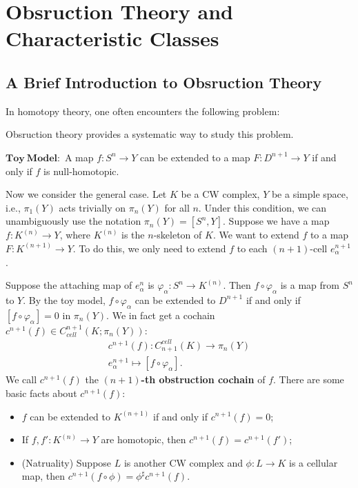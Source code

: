 \documentclass[12pt,a4paper]{article}
\theoremstyle{definition}
\begin{document}
\section*{Obsruction Theory and Characteristic Classes}
\subsection*{A Brief Introduction to Obsruction Theory}
In homotopy theory, one often encounters the following problem: 
\begin{center}
\end{center}
Obsruction theory provides a systematic way to study 
this problem. 

$\mathbf{Toy\ Model:}$ A map $f:S^n\to Y$ can be extended to a map 
$F:D^{n+1}\to Y$ if and only if $f$ is null-homotopic.

Now we consider the general case. Let $K$ be a CW complex, $Y$ be a simple 
space, i.e., $\pi_1(Y)$ acts trivially on $\pi_n(Y)$ for all $n$. Under this 
condition, we can unambiguously use the notation $\pi_n(Y) = [S^n, Y]$.  
Suppose we have a map $f:K^{(n)}\to Y$, where $K^{(n)}$ is the 
$n$-skeleton of $K$. We want to extend $f$ to a map $F:K^{(n+1)}\to Y$. 
To do this, we only need to extend $f$ to each $(n+1)$-cell $e_\alpha^{n+1}$. 

Suppose the attaching map of $e_\alpha^n$ is 
$\varphi_\alpha:S^{n}\to K^{(n)}.$ Then $f\circ \varphi_\alpha$ is a map
from $S^{n}$ to $Y$. By the toy model, $f\circ \varphi_\alpha$ can be
extended to $D^{n+1}$ if and only if $[f\circ \varphi_\alpha] = 0$ in
$\pi_{n}(Y)$. We in fact get a cochain 
$c^{n+1}(f)\in C^{n+1}_{cell}(K;\pi_{n}(Y))$: 
\begin{align*}
    c^{n+1}(f):C_{n+1}^{cell}(K)\to \pi_{n}(Y) \\
    e_\alpha^{n+1}\mapsto [f\circ \varphi_\alpha].
\end{align*}
We call $c^{n+1}(f)$ the \textbf{${(n+1)}$-th obstruction cochain} of $f$. 
There are some basic facts about $c^{n+1}(f)$: 
\begin{itemize}
    \item $f$ can be extended to $K^{(n+1)}$ if and only if $c^{n+1}(f) = 0$; 
    \item If $f,f':K^{(n)}\to Y$ are homotopic, then 
    $c^{n+1}(f) = c^{n+1}(f')$; 
    \item (Natruality) Suppose $L$ is another CW complex and $\phi:L\to K$ 
    is a cellular map, then $c^{n+1}(f\circ \phi) = \phi^{\sharp}c^{n+1}(f)$.
\end{itemize}
\end{document}

